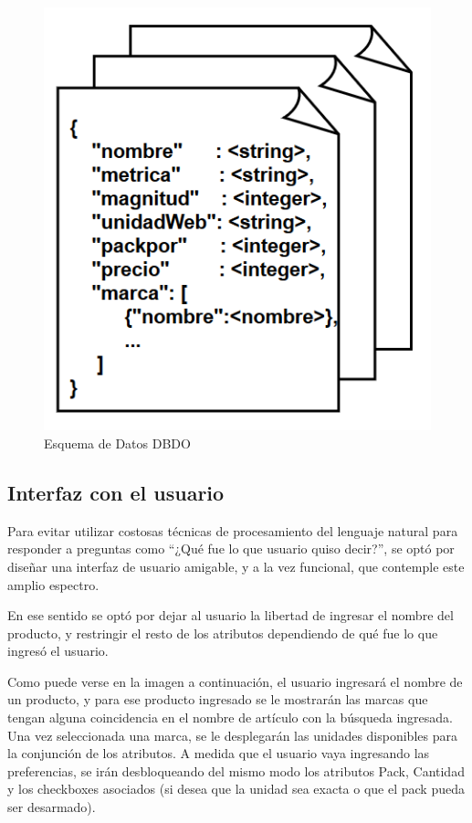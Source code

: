 \documentclass[12pt]{article} %
\begin{document}
\begin{figure}[H]
\includegraphics[scale=1]{documento}
\centering
\caption{Esquema de Datos DBDO}
\end{figure}


\subsection{Interfaz con el usuario}
Para evitar utilizar costosas técnicas de procesamiento del lenguaje natural para responder a preguntas como “¿Qué fue lo que usuario quiso decir?”, se optó por diseñar una interfaz de usuario amigable, y a la vez funcional, que contemple este amplio espectro. 

En ese sentido se optó por dejar al usuario la libertad de ingresar el nombre del producto, y restringir el resto de los atributos dependiendo de qué fue lo que ingresó el usuario.

Como puede verse en la imagen a continuación, el usuario ingresará el nombre de un producto, y para ese producto ingresado se le mostrarán las marcas que tengan alguna coincidencia en el nombre de artículo con la búsqueda ingresada. Una vez seleccionada una marca, se le desplegarán las unidades disponibles para la conjunción de los atributos. A medida que el usuario vaya ingresando las preferencias, se irán desbloqueando del mismo modo los atributos Pack, Cantidad y los checkboxes asociados (si desea que la unidad sea exacta o que el pack pueda ser desarmado).
\end{document}
